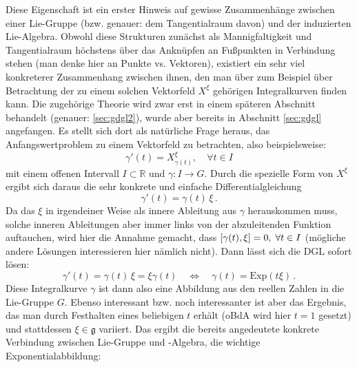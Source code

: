 \documentclass[../H_Analysis_main.tex]{subfiles}
\begin{document}
%


Diese Eigenschaft ist ein erster Hinweis auf gewisse Zusammenhänge zwischen einer Lie-Gruppe (bzw. genauer: dem Tangentialraum davon) und der induzierten Lie-Algebra. Obwohl diese Strukturen zunächst als Mannigfaltigkeit und Tangentialraum höchstens über das Anknüpfen an Fußpunkten in Verbindung stehen (man denke hier an Punkte vs. Vektoren), existiert ein sehr viel konkreterer Zusammenhang zwischen ihnen, den man über zum Beispiel über Betrachtung der zu einem solchen Vektorfeld $X^\xi$ gehörigen Integralkurven finden kann. Die zugehörige Theorie wird zwar erst in einem späteren Abschnitt behandelt (genauer: \ref{sec:gdgl2}), wurde aber bereits in Abschnitt \ref{sec:gdgl} angefangen. Es stellt sich dort als natürliche Frage heraus, das Anfangswertproblem zu einem Vektorfeld zu betrachten, also beispielsweise:
\begin{equation*}
\gamma'(t) = X^\xi_{\gamma(t)}, \quad \forall t \in I
\end{equation*}
mit einem offenen Intervall $I \subset \mathbb{R}$ und $\gamma: I \rightarrow G$. Durch die spezielle Form von $X^\xi$ ergibt sich daraus die sehr konkrete und einfache Differentialgleichung
\begin{equation}
\gamma'(t) = \gamma(t) \, \xi \, .
\end{equation}
Da das $\xi$ in irgendeiner Weise als innere Ableitung aus $\gamma$ herauskommen muss, solche inneren Ableitungen aber immer links von der abzuleitenden Funktion auftauchen, wird hier die Annahme gemacht, dass $\qty[\gamma(t), \xi] = 0, \; \forall t \in I$ (mögliche andere Lösungen interessieren hier nämlich nicht). Dann lässt sich die DGL sofort lösen:
\begin{equation}\label{eq:dglexpabb}
\gamma'(t) = \gamma(t) \, \xi = \xi \gamma(t) \quad \Leftrightarrow \quad \gamma(t) = \text{Exp}(t \xi) \, .
\end{equation}
Diese Integralkurve $\gamma$ ist dann also eine Abbildung aus den reellen Zahlen in die Lie-Gruppe $G$. Ebenso interessant bzw. noch interessanter ist aber das Ergebnis, das man durch Festhalten eines beliebigen $t$ erhält (oBdA wird hier $t = 1$ gesetzt) und stattdessen $\xi \in \mathfrak{g}$ variiert. Das ergibt die bereits angedeutete konkrete Verbindung zwischen Lie-Gruppe und -Algebra, die wichtige Exponentialabbildung:
\end{document}

